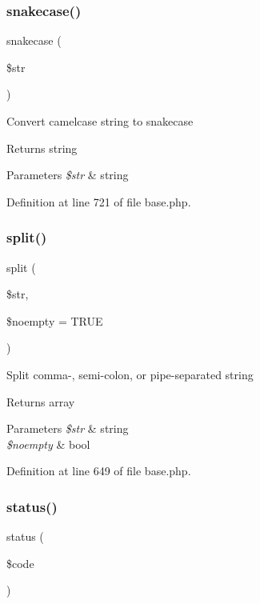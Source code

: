 \subsubsection{\texorpdfstring{snakecase()}{snakecase()}}
{\footnotesize\ttfamily snakecase (\begin{DoxyParamCaption}\item[{}]{\$str }\end{DoxyParamCaption})}

Convert camelcase string to snakecase \begin{DoxyReturn}{Returns}
string 
\end{DoxyReturn}

\begin{DoxyParams}{Parameters}
{\em \$str} & string \\
\hline
\end{DoxyParams}


Definition at line 721 of file base.\+php.

\hypertarget{class_base_ac7b410d4c7145630a45e608d465bb1b5}{}\label{class_base_ac7b410d4c7145630a45e608d465bb1b5} 
\subsubsection{\texorpdfstring{split()}{split()}}
{\footnotesize\ttfamily split (\begin{DoxyParamCaption}\item[{}]{\$str,  }\item[{}]{\$noempty = {\ttfamily TRUE} }\end{DoxyParamCaption})}

Split comma-\/, semi-\/colon, or pipe-\/separated string \begin{DoxyReturn}{Returns}
array 
\end{DoxyReturn}

\begin{DoxyParams}{Parameters}
{\em \$str} & string \\
\hline
{\em \$noempty} & bool \\
\hline
\end{DoxyParams}


Definition at line 649 of file base.\+php.

\hypertarget{class_base_a4505aab5ca6dd00d047da06786883df2}{}\label{class_base_a4505aab5ca6dd00d047da06786883df2} 
\subsubsection{\texorpdfstring{status()}{status()}}
{\footnotesize\ttfamily status (\begin{DoxyParamCaption}\item[{}]{\$code }\end{DoxyParamCaption})}

